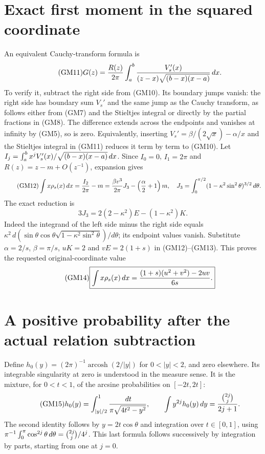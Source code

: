\section{Exact first moment in the squared coordinate}
An equivalent Cauchy-transform formula is
\begin{equation}\tag{GM11}
 G(z)=\frac{R(z)}{2\pi}
 \int_a^b\frac{V_s'(x)}{(z-x)\sqrt{(b-x)(x-a)}}\,d x.
\end{equation}
To verify it, subtract the right side from (GM10). Its boundary jumps
vanish: the right side has boundary sum $V_s'$ and the same jump as
the Cauchy transform, as follows either from (GM7) and the Stieltjes
integral or directly by the partial fractions in (GM8).
The difference extends across the endpoints and vanishes at infinity
by (GM5), so is zero. Equivalently, inserting
$V_s'=\beta/(2\sqrt x)-\alpha/x$ and the Stieltjes integral in (GM11)
reduces it term by term to (GM10).
Let $I_j=\int_a^b x^jV_s'(x)/\sqrt{(b-x)(x-a)}\,d x$.
Since $I_0=0$, $I_1=2\pi$ and $R(z)=z-m+O(z^{-1})$, expansion gives
\begin{equation}\tag{GM12}
 \int x\rho_s(x)\,d x=\frac{I_2}{2\pi}-m
 =\frac{\beta v^3}{2\pi}J_3-\left(\frac\alpha2+1\right)m,
 \quad J_3=\int_0^{\pi/2}(1-\kappa^2\sin^2\theta)^{3/2}\,d\theta.
\end{equation}
The exact reduction is
\begin{equation}\tag{GM13}
 3J_3=2(2-\kappa^2)E-(1-\kappa^2)K.
\end{equation}
Indeed the integrand of the left side minus the right side equals
$\kappa^2\,d(\sin\theta\cos\theta
\sqrt{1-\kappa^2\sin^2\theta})/d\theta$; its endpoint values vanish.
Substitute $\alpha=2/s$, $\beta=\pi/s$, $uK=2$ and $vE=2(1+s)$
in (GM12)--(GM13). This proves the requested original-coordinate value
\begin{equation}\tag{GM14}
 \boxed{\displaystyle\int x\rho_s(x)\,d x
 =\frac{(1+s)(u^2+v^2)-2uv}{6s}.}
\end{equation}

\section{A positive probability after the actual relation subtraction}
Define $h_0(y)=(2\pi)^{-1}\operatorname{arcosh}(2/|y|)$ for $0<|y|<2$,
and zero elsewhere. Its integrable singularity at zero is understood in
the measure sense. It is the mixture, for $0<t<1$, of the arcsine
probabilities on $[-2t,2t]$:
\begin{equation}\tag{GM15}
 h_0(y)=\int_{|y|/2}^1\frac{\,d t}{\pi\sqrt{4t^2-y^2}},\qquad
 \int y^{2j}h_0(y)\,d y=\frac{\binom{2j}j}{2j+1}.
\end{equation}
The second identity follows by $y=2t\cos\theta$ and integration over
$t\in[0,1]$, using
$\pi^{-1}\int_0^\pi\cos^{2j}\theta\,d\theta=\binom{2j}j/4^j$.
This last formula follows successively by integration by parts, starting
from one at $j=0$.

